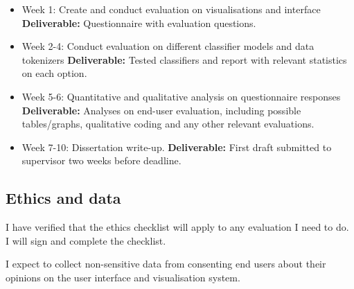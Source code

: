 \documentclass[11pt]{article}
\begin{document}
\begin{itemize}
    \tightlist
    \item
      Week 1: Create and conduct evaluation on visualisations and interface \textbf{Deliverable:}
      Questionnaire with evaluation questions.
    \item
      Week 2-4: Conduct evaluation on different classifier models and data tokenizers \textbf{Deliverable:} Tested classifiers and report with relevant statistics on each option.
    \item
      Week 5-6: Quantitative and qualitative analysis on questionnaire responses
      \textbf{Deliverable:} Analyses on end-user evaluation, including possible tables/graphs, qualitative coding and any other relevant evaluations.
    \item
      Week 7-10: Dissertation write-up.
      \textbf{Deliverable:} First draft submitted to supervisor two weeks before deadline.
    \end{itemize}
 
\subsection{Ethics and data}\label{ethics}
I have verified that the ethics checklist will apply to any evaluation I need to do. I will sign and complete the checklist. 

I expect to collect non-sensitive data from consenting end users about their opinions on the user interface and visualisation system.
\end{document}
